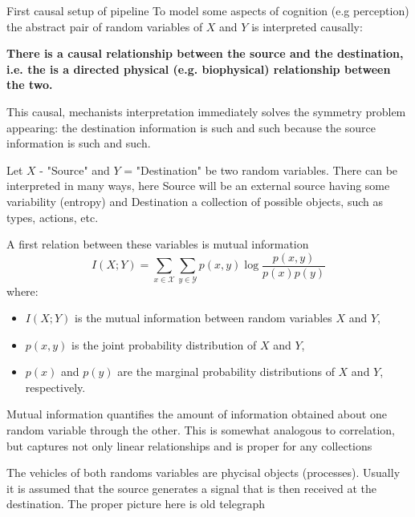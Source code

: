\documentclass[10pt, aspectratio=169, handout]{beamer}
\begin{document}
\begin{frame} [label=first_causal_setup] {First causal  setup of pipeline  }
To model some aspects of cognition (e.g perception) the abstract pair of random variables of \(X\) and \(Y\) is interpreted causally:

\textbf{There is a causal relationship between the source and the destination, i.e. the is a directed  physical (e.g. biophysical) relationship between the two.} 

This causal, mechanists interpretation immediately solves the symmetry problem appearing: the destination information is such and such because the source information is such and such.

Let \(X\) - "Source" and \(Y\) = "Destination" be two random variables. 
There can be interpreted in many ways, here Source will be an external source having some variability (entropy) and Destination a collection of possible objects, such as types, actions, etc.

A first relation between these variables is mutual information 
\[
I(X;Y) = \sum_{x \in \mathcal{X}} \sum_{y \in \mathcal{Y}} p(x, y) \log \frac{p(x, y)}{p(x)p(y)}
\]
where:
\begin{itemize}
    \item \(I(X;Y)\) is the mutual information between random variables \(X\) and \(Y\),
    \item \(p(x, y)\) is the joint probability distribution of \(X\) and \(Y\),
    \item \(p(x)\) and \(p(y)\) are the marginal probability distributions of \(X\) and \(Y\), respectively.
\end{itemize}
Mutual information quantifies the amount of information obtained about one random variable through the other.
This is somewhat analogous to correlation, but captures not only linear relationships and is proper for any collections


The vehicles of both randoms variables are phycisal objects (processes).
Usually it is assumed that the source generates a signal that is then received  at the destination.
The proper picture here is old telegraph


\end{frame}
\end{document}
